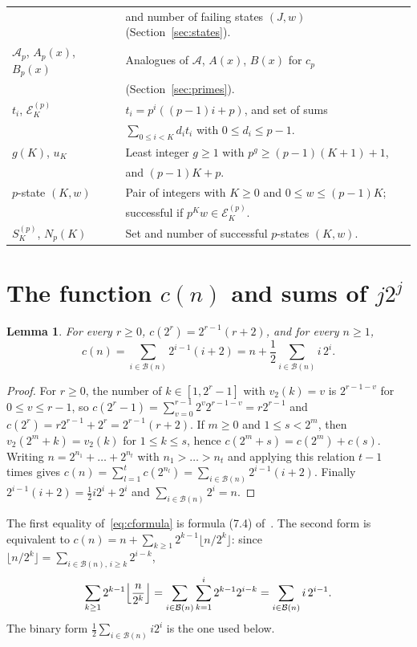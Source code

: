 \documentclass[11pt]{amsart}
\newtheorem{Lemma}[Theorem]{Lemma}
\theoremstyle{definition}
\begin{document}
\begin{table}[H]
\begin{tabular}{ll}
& and number of failing states $(J,w)$ (Section~\ref{sec:states}).\\
$\mathcal{A}_p$, $A_p(x)$, $B_p(x)$ & Analogues of $\mathcal{A}$, $A(x)$, $B(x)$ for $c_p$\\
& (Section~\ref{sec:primes}).\\
$t_i$, $\mathcal{E}^{(p)}_K$ & $t_i=p^i((p-1)i+p)$, and set of sums\\
& $\sum_{0\le i<K}d_it_i$ with $0\le d_i\le p-1$.\\
$g(K)$, $u_K$ & Least integer $g\ge1$ with $p^g\ge(p-1)(K+1)+1$,\\
& and $(p-1)K+p$.\\
$p$-state $(K,w)$ & Pair of integers with $K\ge0$ and $0\le w\le(p-1)K$;\\
& successful if $p^Kw\in\mathcal{E}^{(p)}_K$.\\
$S^{(p)}_K$, $N_p(K)$ & Set and number of successful $p$-states $(K,w)$.\\
\bottomrule
\end{tabular}
\end{table}

\section{The function $c(n)$ and sums of $j2^j$}
\label{sec:reformulation}
\begin{Lemma}
\label{lem:cformula}
For every $r\ge0$, $c(2^r)=2^{r-1}(r+2)$, and for every $n\ge1$,
\begin{equation}
\label{eq:cformula}
c(n)=\sum_{i\in\mathcal{B}(n)}2^{i-1}(i+2)=n+\frac12\sum_{i\in\mathcal{B}(n)}i\,2^{i}.
\end{equation}
\end{Lemma}
\begin{proof}
For $r\ge0$, the number of $k\in[1,2^r-1]$ with $v_2(k)=v$ is $2^{r-1-v}$ for $0\le v\le r-1$, so $c(2^r-1)=\sum_{v=0}^{r-1}2^v2^{r-1-v}=r2^{r-1}$ and $c(2^r)=r2^{r-1}+2^r=2^{r-1}(r+2)$. If $m\ge0$ and $1\le s<2^m$, then $v_2(2^m+k)=v_2(k)$ for $1\le k\le s$, hence $c(2^m+s)=c(2^m)+c(s)$. Writing $n=2^{n_1}+\dots+2^{n_t}$ with $n_1>\dots>n_t$ and applying this relation $t-1$ times gives $c(n)=\sum_{l=1}^{t}c(2^{n_l})=\sum_{i\in\mathcal{B}(n)}2^{i-1}(i+2)$. Finally $2^{i-1}(i+2)=\frac12 i2^i+2^i$ and $\sum_{i\in\mathcal{B}(n)}2^i=n$.
\end{proof}

The first equality of~\eqref{eq:cformula} is formula (7.4) of~\cite{nicolas2005open}. The second form is equivalent to $c(n)=n+\sum_{k\ge1}2^{k-1}\lfloor n/2^k\rfloor$: since $\lfloor n/2^k\rfloor=\sum_{i\in\mathcal{B}(n),\,i\ge k}2^{i-k}$,
\[
\sum_{k\ge1}2^{k-1}\Bigl\lfloor\frac{n}{2^k}\Bigr\rfloor=\sum_{i\in\mathcal{B}(n)}\sum_{k=1}^{i}2^{k-1}2^{i-k}=\sum_{i\in\mathcal{B}(n)}i\,2^{i-1}.
\]
The binary form $\frac12\sum_{i\in\mathcal{B}(n)}i2^i$ is the one used below.
\end{document}
